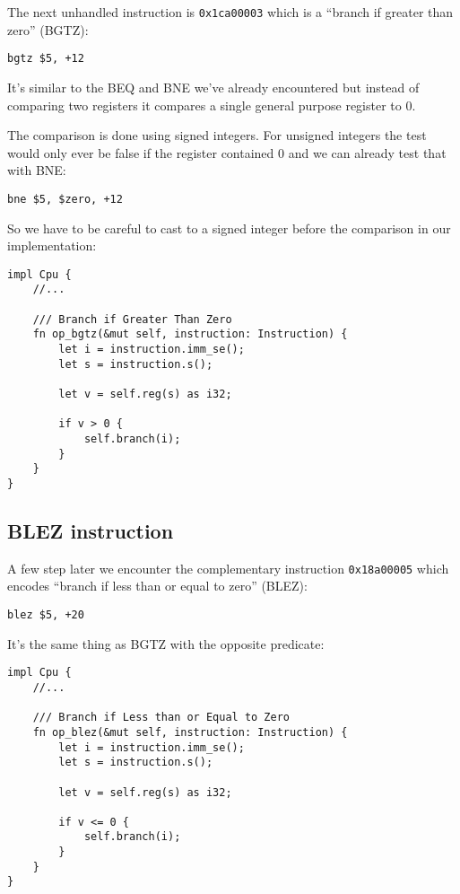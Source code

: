 \documentclass[a4paper]{article}
\newcommand{\code}[1] {\texttt{#1}}
\begin{document}
The next unhandled instruction is \code{0x1ca00003} which is a
``branch if greater than zero'' (BGTZ):

\begin{lstlisting}[language=assembly]
bgtz $5, +12
\end{lstlisting}

It's similar to the BEQ and BNE we've already encountered but
instead of comparing two registers it compares a single general
purpose register to 0.

The comparison is done using signed integers. For unsigned integers
the test would only ever be false if the register contained 0 and we
can already test that with BNE:

\begin{lstlisting}[language=assembly]
bne $5, $zero, +12
\end{lstlisting}

So we have to be careful to cast to a signed integer before the
comparison in our implementation:

\begin{lstlisting}
impl Cpu {
    //...

    /// Branch if Greater Than Zero
    fn op_bgtz(&mut self, instruction: Instruction) {
        let i = instruction.imm_se();
        let s = instruction.s();

        let v = self.reg(s) as i32;

        if v > 0 {
            self.branch(i);
        }
    }
}
\end{lstlisting}

\subsection{BLEZ instruction}

A few step later we encounter the complementary instruction
\code{0x18a00005} which encodes ``branch if less than or equal to
zero'' (BLEZ):

\begin{lstlisting}[language=assembly]
blez $5, +20
\end{lstlisting}

It's the same thing as BGTZ with the opposite predicate:

\begin{lstlisting}
impl Cpu {
    //...

    /// Branch if Less than or Equal to Zero
    fn op_blez(&mut self, instruction: Instruction) {
        let i = instruction.imm_se();
        let s = instruction.s();

        let v = self.reg(s) as i32;

        if v <= 0 {
            self.branch(i);
        }
    }
}
\end{lstlisting}
\end{document}
